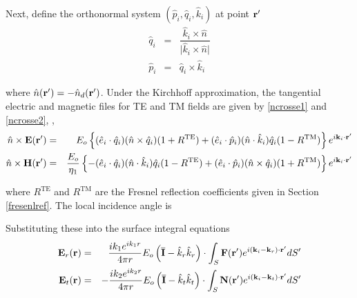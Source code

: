 Next, define the orthonormal system $(\hat{p}_i,\hat{q}_i,\hat{k}_i)$ at point $\mathbf{r}'$ 
\begin{eqnarray}
\hat{q}_i &=& \dfrac{\hat{k}_i \times \hat{n} }{ \vert \hat{k}_i \times \hat{n} \vert } \\
\hat{p}_i &=& \hat{q}_i \times \hat{k}_i 
\end{eqnarray}

\noindent where $\hat{n}(\mathbf{r}') = -\hat{n}_d(\mathbf{r}')$.  Under the Kirchhoff approximation, the tangential electric and magnetic files for TE and TM fields are given by \eqref{ncrosse1} and \eqref{ncrosse2}, \cite{kong1986electromagnetic}, 
\begin{eqnarray}
\hat{n} \times \mathbf{E}(\mathbf{r}') & = & E_o\left\{ (\hat{e}_i \cdot \hat{q}_i )(\hat{n} \times \hat{q}_i) (1 + R^{\textrm{TE}}) + 
(\hat{e}_i \cdot \hat{p}_i )(\hat{n} \cdot \hat{k}_i) \hat{q}_i (1 - R^{\textrm{TM}}) \right\} e^{i\mathbf{k}_i \cdot \mathbf{r}'} \label{ncrosse1}  \\
\hat{n} \times \mathbf{H}(\mathbf{r}') & = & \dfrac{E_o}{\eta_1}\left\{ -(\hat{e}_i \cdot \hat{q}_i )(\hat{n} \cdot \hat{k}_i) \hat{q}_i (1 - R^{\textrm{TE}}) + (\hat{e}_i \cdot \hat{p}_i )(\hat{n} \times \hat{q}_i) (1 + R^{\textrm{TM}}) \right\} e^{i\mathbf{k}_i \cdot \mathbf{r}'}  \label{ncrosse2}
\end{eqnarray}

\noindent where $R^{\textrm{TE}}$ and $R^{\textrm{TM}}$ are the Fresnel reflection coefficients given in Section \ref{fresenlref}. The local incidence angle is

Substituting these into the surface integral equations
\begin{eqnarray}
\mathbf{E}_r(\mathbf{r}) & = & \dfrac{ik_1e^{ik_1r}}{4\pi r} E_o \left( \overline{\mathbf{I}} - \hat{k}_r \hat{k}_r \right)  \cdot \int_S  \mathbf{F}(\mathbf{r}') e^{i (\mathbf{k}_i - \mathbf{k}_r) \cdot \mathbf{r}'} dS' \label{kirchint1} \\
\mathbf{E}_t(\mathbf{r}) & = & -\dfrac{ik_2e^{ik_2r}}{4\pi r} E_o \left( \overline{\mathbf{I}} - \hat{k}_t \hat{k}_t \right)  \cdot \int_S  \mathbf{N}(\mathbf{r}') e^{i (\mathbf{k}_i - \mathbf{k}_t) \cdot \mathbf{r}'} dS' \label{kirchint2} 
\end{eqnarray}

